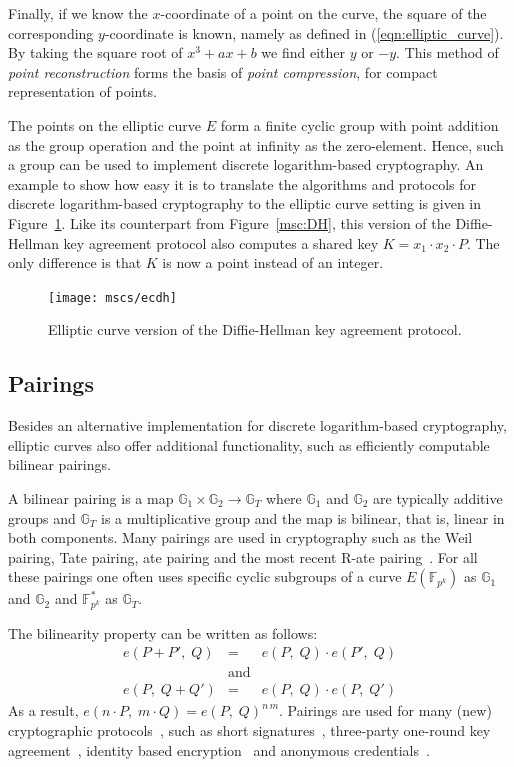 Finally, if we know the $x$-coordinate of a point on the curve, the square of
the corresponding $y$-coordinate is known, namely as defined in
(\ref{eqn:elliptic_curve}). By taking the square root of $x^{3} + ax + b$ we
find either $y$ or $-y$. This method of \emph{point reconstruction} forms the
basis of \emph{point compression}, for compact representation of points.

The points on the elliptic curve $E$ form a finite cyclic group with point
addition as the group operation and the point at infinity as the zero-element.
Hence, such a group can be used to implement discrete logarithm-based
cryptography. An example to show how easy it is to translate the algorithms and
protocols for discrete logarithm-based cryptography to the elliptic curve
setting is given in Figure~\ref{msc:ECDH}. Like its counterpart from
Figure~\ref{msc:DH}, this version of the Diffie-Hellman key agreement protocol
also computes a shared key $K = x_1 \cdot x_2 \cdot P$. The only difference is
that $K$ is now a point instead of an integer.

\begin{figure}[ht]
  \centering
  \texttt{[image: mscs/ecdh]}
  \caption{Elliptic curve version of the Diffie-Hellman key agreement protocol.}
  \label{msc:ECDH}
\end{figure}

\subsection{Pairings\label{sec:pairings}}

Besides an alternative implementation for discrete logarithm-based cryptography,
elliptic curves also offer additional functionality, such as efficiently
computable bilinear pairings.

A bilinear pairing is a map $\mathbb{G}_1 \times \mathbb{G}_2 \rightarrow
\mathbb{G}_T$ where $\mathbb{G}_1$ and $\mathbb{G}_2$ are typically additive
groups and $\mathbb G_T$ is a multiplicative group and the map is bilinear, that
is, linear in both components. Many pairings are used in cryptography such as the
Weil pairing, Tate pairing, ate pairing and the most recent R-ate
pairing~\cite{Vercauteren09}. For all these pairings one often uses specific
cyclic subgroups of a curve $E(\mathbb{F}_{p^k})$ as $\mathbb{G}_1$ and $\mathbb{G}_2$
and $\mathbb{F}_{p^k}^*$ as $\mathbb{G}_T$.

The bilinearity property can be written as follows:
\begin{equation*}
  \begin{array}{rcl}
    e(P + P',\; Q) & = & e(P,\; Q)\cdot e(P',\; Q) \\
     & \text{and} & \\
    e(P,\; Q + Q') & = & e(P,\; Q)\cdot e(P,\; Q')
  \end{array}
\end{equation*}
As a result, $e(n\cdot P,\; m\cdot Q) = e(P,\; Q)^{n\,m}$. Pairings are used
for many (new) cryptographic protocols~\cite{BSS05}, such as short
signatures~\cite{BonehLS04}, three-party one-round key agreement~\cite{Joux04},
identity based encryption~\cite{BonehFranklin01} and anonymous
credentials~\cite{CamenischLysyanskaya04}.

